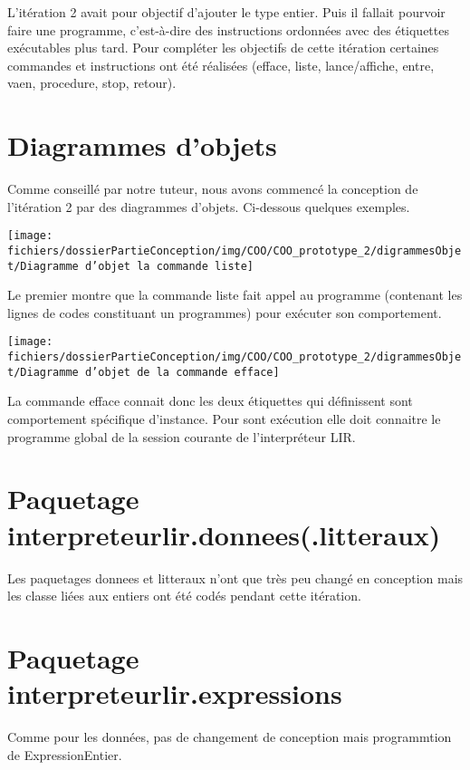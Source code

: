 \par L'itération 2 avait pour objectif d'ajouter le type entier. Puis il fallait pourvoir faire une programme, c'est-à-dire des instructions ordonnées avec des étiquettes exécutables plus tard. Pour compléter les objectifs de cette itération certaines commandes et instructions ont été réalisées (efface, liste, lance/affiche, entre, vaen, procedure, stop, retour).

\section{Diagrammes d'objets}
Comme conseillé par notre tuteur, nous avons commencé la conception de l'itération 2 par des diagrammes d'objets. Ci-dessous quelques exemples.
\par
\begin{center}\texttt{[image: fichiers/dossierPartieConception/img/COO/COO\_prototype\_2/digrammesObjet/Diagramme d'objet la commande liste]}
\end{center}
\par Le premier montre que la commande liste fait appel au programme (contenant les lignes de codes constituant un programmes) pour exécuter son comportement.
\par
\begin{center}\texttt{[image: fichiers/dossierPartieConception/img/COO/COO\_prototype\_2/digrammesObjet/Diagramme d'objet de la commande efface]}\end{center}
\par La commande efface connait donc les deux étiquettes qui définissent sont comportement spécifique d'instance. Pour sont exécution elle doit connaitre le programme global de la session courante de l'interpréteur LIR.

\section{Paquetage interpreteurlir.donnees(.litteraux)}
\par Les paquetages donnees et litteraux n'ont que très peu changé en conception mais les classe liées aux entiers ont été codés pendant cette itération.

\section{Paquetage interpreteurlir.expressions}
\par Comme pour les données, pas de changement de conception mais programmtion de ExpressionEntier.

